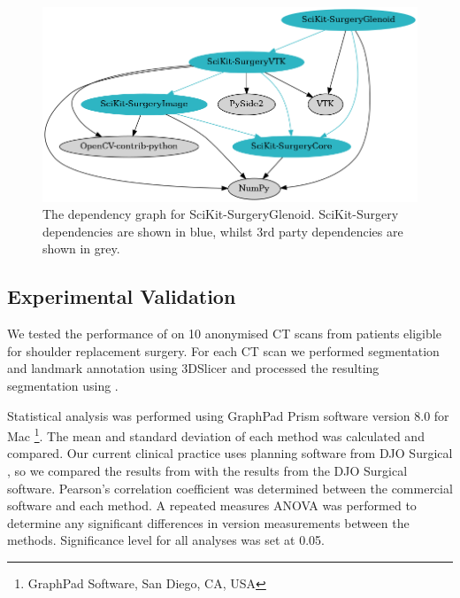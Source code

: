 \begin{figure}
        \begin{center}
                \includegraphics[width=0.6\linewidth]{figures/dep_graph.png}
                        \caption{\label{fig:deps}The dependency graph for SciKit-SurgeryGlenoid. SciKit-Surgery dependencies are shown in blue, whilst 3rd party dependencies are shown in grey.}
        \end{center}
\end{figure}

\subsection{Experimental Validation}
\label{sec:exp_methods}
We tested the performance of \sksglenoid on 10 anonymised {CT} scans from patients 
eligible for shoulder replacement surgery. For each {CT} scan we performed segmentation 
and landmark annotation using 3DSlicer \cite{Kikinis2014} and processed
the resulting 
segmentation using \sksglenoidns. 

Statistical analysis was performed using GraphPad Prism software version 8.0 for
Mac \footnote{GraphPad Software, San Diego, CA, USA}. The mean and standard deviation of 
each method was calculated and compared. Our current clinical practice uses planning 
software from {DJO} Surgical \cite{djosurgical}, so we compared the results from 
\sksglenoid with the results from the {DJO} Surgical software. 
Pearson’s correlation coefficient was 
determined between the commercial software and each method. 
A repeated measures ANOVA was performed to determine any significant differences
in version measurements between the methods. Significance level for all analyses was set at 0.05.

